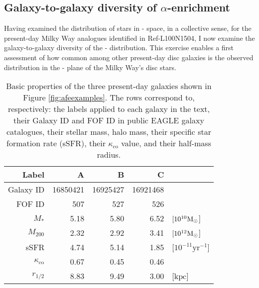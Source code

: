 \subsection{Galaxy-to-galaxy diversity of $\alpha$-enrichment}
\label{sec:afefeh_diversity}

Having examined the distribution of stars in \afe{}-\feh{} space, in a collective sense, for the present-day Milky Way analogues identified in Ref-L100N1504, I now examine the galaxy-to-galaxy diversity of the \afe{}-\feh{} distribution. This exercise enables a first assessment of how common among other present-day disc galaxies is the observed distribution in the \afe{}-\feh{} plane of the Milky Way's disc stars.

\begin{table}
\center
\caption[Properties of three example disk galaxies from the Ref-L100N1504 simulation]{\label{tab:diag} Basic properties of the three present-day galaxies shown in Figure \ref{fig:afeexamples}. The rows correspond to, respectively: the labels applied to each galaxy in the text, their Galaxy ID and FOF ID in public EAGLE galaxy catalogues, their stellar mass, halo mass, their specific star formation rate (sSFR), their  $\kappa_{\mathrm{co}}$ value, and their half-mass radius.}
\begin{tabular}[]{r|rrrl}
\hline
\hline
Label                               & A    & B    & C    &  \\
\hline
Galaxy ID							& 16850421 & 16925427 & 16921468  & \\
FOF ID                              & 507  & 527  & 526  &  \\
$M_{*}$                             & 5.18 & 5.80 & 6.52 & $[10^{10} {\rm M}_{\odot}$] \\
$M_{200}$                           & 2.32 & 2.92 & 3.41 & $[10^{12} {\rm M}_{\odot}$] \\
sSFR                                & 4.74 & 5.14 & 1.85 & [$ 10^{-11} \mathrm{yr^{-1}}$] \\
$\kappa_{\mathrm{co}}$            & 0.67 & 0.45 & 0.46 & \\
$r_{1/2}$                           & 8.83 & 9.49 & 3.00 & [$\mathrm{kpc}$] \\
\hline
\end{tabular}

\end{table}


